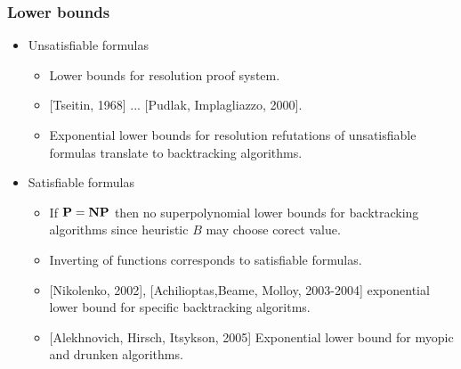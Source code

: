\begin{frame}
    \frametitle{Lower bounds}

	\begin{itemize}
		\item Unsatisfiable formulas
		\begin{itemize}
			\item Lower bounds for resolution proof system.
			\item{} [Tseitin, 1968] ... [Pudlak, Implagliazzo, 2000].
			\item{} Exponential lower bounds for resolution refutations
				of unsatisfiable formulas translate to backtracking
                algorithms.
		\end{itemize}
        \pause
		\item Satisfiable formulas
		\begin{itemize}
			\item If $\bf P = NP$ then no superpolynomial lower bounds
		        for backtracking algorithms since heuristic $B$ may
                choose corect value.
            \pause
			\item Inverting of functions corresponds to satisfiable
		        formulas.
            \pause
            \item{} [Nikolenko, 2002], [Achilioptas,Beame, Molloy, 2003-2004]
				exponential lower bound for specific backtracking
                algoritms.
            \item{} [Alekhnovich, Hirsch, Itsykson, 2005] Exponential lower bound 
				for myopic and drunken algorithms.
		\end{itemize}
	\end{itemize}
\end{frame}

